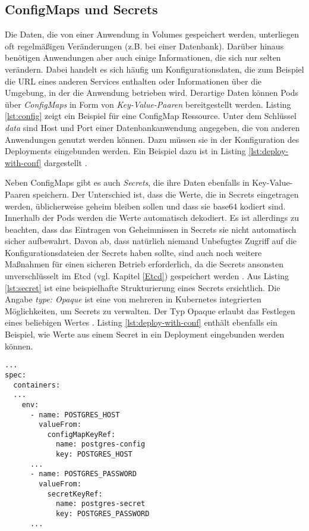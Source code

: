 \documentclass[11pt,a4paper]{article}
\begin{document}
\subsection{ConfigMaps und Secrets}
Die Daten, die von einer Anwendung in Volumes gespeichert werden, unterliegen oft regelmäßigen Veränderungen
(z.B. bei einer Datenbank). Darüber hinaus benötigen Anwendungen aber auch einige Informationen, die sich nur
selten verändern. Dabei handelt es sich häufig um Konfigurationsdaten, die zum Beispiel die URL eines anderen
Services enthalten oder Informationen über die Umgebung, in der die Anwendung betrieben wird.
Derartige Daten können Pods über \emph{ConfigMaps} in Form von \emph{Key-Value-Paaren} bereitgestellt werden.
Listing \ref{lst:config} zeigt ein Beispiel für eine ConfigMap Ressource.
Unter dem Schlüssel \emph{data} sind Host und Port einer Datenbankanwendung angegeben,
die von anderen Anwendungen genutzt werden können. Dazu müssen sie in der Konfiguration des
Deployments eingebunden werden. Ein Beispiel dazu ist in Listing \ref{lst:deploy-with-conf} dargestellt \cite{Schmeling_Dargatz_2022}.




Neben ConfigMaps gibt es auch \emph{Secrets}, die ihre Daten ebenfalls in Key-Value-Paaren speichern.
Der Unterschied ist, dass die Werte, die in Secrets eingetragen werden, üblicherweise geheim bleiben sollen und
dass sie base64 \cite{rfc4648} kodiert sind. Innerhalb der Pods werden die Werte automatisch dekodiert.
Es ist allerdings zu beachten, dass das Eintragen von Geheimnissen in Secrets sie nicht automatisch sicher
aufbewahrt. Davon ab, dass natürlich niemand Unbefugtes Zugriff auf die Konfigurationsdateien der Secrets haben sollte,
sind auch noch weitere Maßnahmen für einen sicheren Betrieb erforderlich, da die Secrets ansonsten
unverschlüsselt im Etcd (vgl. Kapitel \ref{Etcd}) gespeichert werden \cite{Schmeling_Dargatz_2022}.
Aus Listing \ref{lst:secret} ist eine beispielhafte Strukturierung eines Secrets ersichtlich.
Die Angabe \emph{type: Opaque} ist eine von mehreren in Kubernetes integrierten Möglichkeiten,
um Secrets zu verwalten. Der Typ Opaque erlaubt das Festlegen eines beliebigen Wertes \cite{kubernetes.io_secret_types}.
Listing \ref{lst:deploy-with-conf} enthält ebenfalls ein Beispiel, wie Werte aus einem
Secret in ein Deployment eingebunden werden können.


\begin{lstlisting}[caption={Referenzen zur ConfigMaps und Secrets können in einem Deployment unter dem Schlüssel \emph{env} definiert werden.}, label={lst:deploy-with-conf}]
...
spec:
  containers:
  ...
    env:
      - name: POSTGRES_HOST
        valueFrom:
          configMapKeyRef:
            name: postgres-config
            key: POSTGRES_HOST
      ...
      - name: POSTGRES_PASSWORD
        valueFrom:
          secretKeyRef:
            name: postgres-secret
            key: POSTGRES_PASSWORD
      ...
\end{lstlisting}
\end{document}

